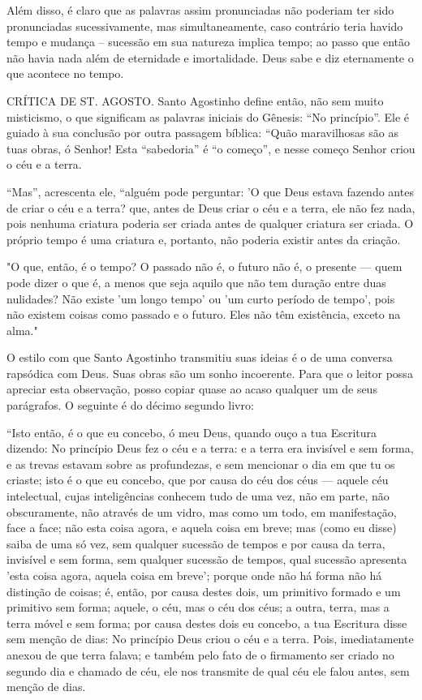 \documentclass[11pt,a5paper,twoside,openany]{book}
\begin{document}
Além disso, é claro que as palavras assim pronunciadas não poderiam ter sido pronunciadas sucessivamente, mas simultaneamente, caso contrário teria havido tempo e mudança – sucessão em sua natureza implica tempo; ao passo que então não havia nada além de eternidade e imortalidade. Deus sabe e diz eternamente o que acontece no tempo.

CRÍTICA DE ST. AGOSTO. Santo Agostinho define então, não sem muito misticismo, o que significam as palavras iniciais do Gênesis: “No princípio”. Ele é guiado à sua conclusão por outra passagem bíblica: “Quão maravilhosas são as tuas obras, ó Senhor! Esta “sabedoria” é “o começo”, e nesse começo Senhor criou o céu e a terra.

“Mas”, acrescenta ele, “alguém pode perguntar: 'O que Deus estava fazendo antes de criar o céu e a terra? que, antes de Deus criar o céu e a terra, ele não fez nada, pois nenhuma criatura poderia ser criada antes de qualquer criatura ser criada. O próprio tempo é uma criatura e, portanto, não poderia existir antes da criação.

"O que, então, é o tempo? O passado não é, o futuro não é, o presente — quem pode dizer o que é, a menos que seja aquilo que não tem duração entre duas nulidades? Não existe 'um longo tempo' ou 'um curto período de tempo', pois não existem coisas como passado e o futuro. Eles não têm existência, exceto na alma."

O estilo com que Santo Agostinho transmitiu suas ideias é o de uma conversa rapsódica com Deus. Suas obras são um sonho incoerente. Para que o leitor possa apreciar esta observação, posso copiar quase ao acaso qualquer um de seus parágrafos. O seguinte é do décimo segundo livro:

“Isto então, é o que eu concebo, ó meu Deus, quando ouço a tua Escritura dizendo: No princípio Deus fez o céu e a terra: e a terra era invisível e sem forma, e as trevas estavam sobre as profundezas, e sem mencionar o dia em que tu os criaste; isto é o que eu concebo, que por causa do céu dos céus — aquele céu intelectual, cujas inteligências conhecem tudo de uma vez, não em parte, não obscuramente, não através de um vidro, mas como um todo, em manifestação, face a face; não esta coisa agora, e aquela coisa em breve; mas (como eu disse) saiba de uma só vez, sem qualquer sucessão de tempos e por causa da terra, invisível e sem forma, sem qualquer sucessão de tempos, qual sucessão apresenta 'esta coisa agora, aquela coisa em breve'; porque onde não há forma não há distinção de coisas; é, então, por causa destes dois, um primitivo formado e um primitivo sem forma; aquele, o céu, mas o céu dos céus; a outra, terra, mas a terra móvel e sem forma; por causa destes dois eu concebo, a tua Escritura disse sem menção de dias: No princípio Deus criou o céu e a terra. Pois, imediatamente anexou de que terra falava; e também pelo fato de o firmamento ser criado no segundo dia e chamado de céu, ele nos transmite de qual céu ele falou antes, sem menção de dias.
\end{document}
